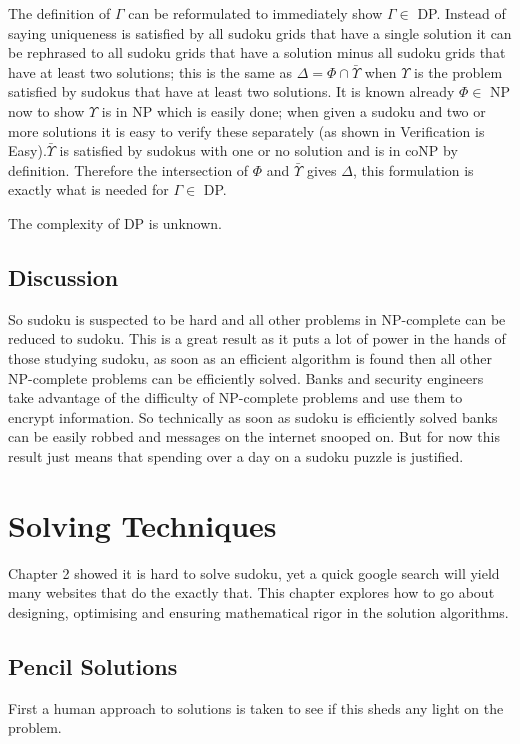 \documentclass[a4paper,11pt]{report}
\begin{document}
The definition of $\Gamma$ can be reformulated to immediately show $\Gamma\in$ DP. Instead of saying uniqueness is satisfied by all sudoku grids that have a single solution it can be rephrased to all sudoku grids that have a solution minus all sudoku grids that have at least two solutions; this is the same as $\Delta = \Phi \cap \bar{\Upsilon}$ when $\Upsilon$ is the problem satisfied by sudokus that have at least two solutions. It is known already $\Phi\in$ NP now to show $\Upsilon$ is in NP which is easily done; when given a sudoku and two or more solutions it is easy to verify these separately (as shown in Verification is Easy).$\bar{\Upsilon}$ is satisfied by sudokus with one or no solution and is in coNP by definition. Therefore the intersection of $\Phi$ and $\bar{\Upsilon}$ gives $\Delta$, this formulation is exactly what is needed for $\Gamma\in$ DP.

The complexity of DP is unknown\cite{dphardness}. 

\section{Discussion}
So sudoku is suspected to be hard and all other problems in NP-complete can be reduced to sudoku. This is a great result as it puts a lot of power in the hands of those studying sudoku, as soon as an efficient algorithm is found then all other NP-complete problems can be efficiently solved. Banks and security engineers take advantage of the difficulty of NP-complete problems and use them to encrypt information. So technically as soon as sudoku is efficiently solved banks can be easily robbed and messages on the internet snooped on. But for now this result just means that spending over a day on a sudoku puzzle is justified.

\chapter{Solving Techniques}
Chapter 2 showed it is hard to solve sudoku, yet a quick google search will yield many websites that do the exactly that. This chapter explores how to go about designing, optimising and ensuring mathematical rigor in the solution algorithms.
\section{Pencil Solutions}
First a human approach to solutions is taken to see if this sheds any light on the problem.
\end{document}
